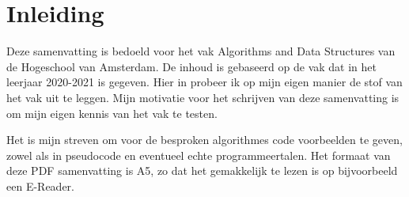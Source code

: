 \section*{Inleiding}
Deze samenvatting is bedoeld voor het vak Algorithms and Data Structures van de Hogeschool van Amsterdam.
De inhoud is gebaseerd op de vak dat in het leerjaar 2020-2021 is gegeven.
Hier in probeer ik op mijn eigen manier de stof van het vak uit te leggen.
Mijn motivatie voor het schrijven van deze samenvatting is om mijn eigen kennis van het vak te testen.

Het is mijn streven om voor de besproken algorithmes code voorbeelden te geven, zowel als in pseudocode en eventueel echte programmeertalen.
Het formaat van deze PDF samenvatting is A5, zo dat het gemakkelijk te lezen is op bijvoorbeeld een E-Reader.

